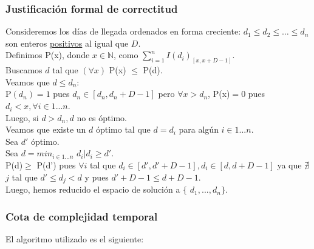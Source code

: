 \documentclass[11pt, a4paper, twoside]{article}
\begin{document}
\subsubsection{Justificación formal de correctitud}

Consideremos los días de llegada ordenados en forma creciente: $d_1 \le d_2 \le \dots \le d_n$ son enteros \underline{positivos} al igual que $D$. \\
Definimos P(x), donde $x \in \mathbb{N}$, como $\sum_{i=1}^{n} I(d_i)_{[x,x+D-1]}$. \\
Buscamos $d$ tal que $(\forall x)$ P(x) $\le$ P(d). \\
Veamos que $d \le d_n$: \\
P$(d_n)=1$ pues $d_n \in [d_n,d_n + D - 1]$ pero $\forall x > d_n$, P(x)$=0$ pues $d_i < x, \forall i \in 1...n$.\\
Luego, si $d > d_n, d$ no es óptimo. \\
Veamos que existe un $d$ óptimo tal que $d=d_i$ para algún $i \in 1...n$. \\
Sea $d'$ óptimo. \\
Sea $d=min_{i \in 1...n}$ $d_i \big| d_i \ge d'$. \\
P(d)$\ge$ P(d') pues $\forall i$ tal que $d_i \in [d',d'+D-1], d_i \in [d,d+D-1]$ ya que $\nexists$ $j$ tal que $d' \le d_j < d$ y pues $d'+D-1 \le d+D-1$. \\
Luego, hemos reducido el espacio de solución a $\{$ $d_1,...,d_n$$\}$.



\newpage
\subsubsection{Cota de complejidad temporal}
El algoritmo utilizado es el siguiente:
\end{document}

